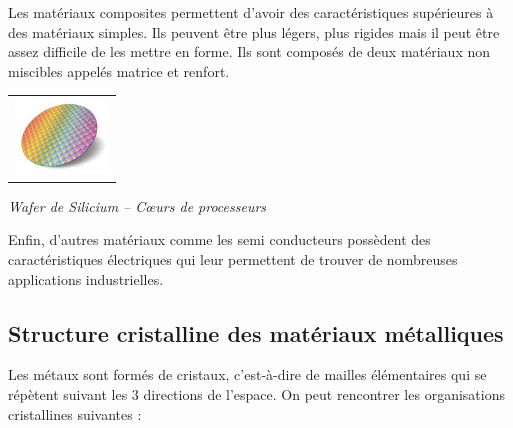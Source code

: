 \documentclass[11pt,oneside]{article}
\begin{document}
\vspace{.5cm}

Les matériaux composites permettent d'avoir des caractéristiques supérieures à des matériaux simples. Ils peuvent être plus légers, plus rigides mais il peut être assez difficile de les mettre en forme. Ils sont composés de deux matériaux non miscibles appelés matrice et renfort. 

\begin{minipage}[c]{.3\linewidth}
\begin{center}
\begin{tabular}{c}
\includegraphics[height=2cm]{png/wafer}
\\
\end{tabular}

\textit{Wafer de Silicium \cite{wafer} -- C\oe{}urs de processeurs}
\end{center}
\end{minipage}\hfill
\begin{minipage}[c]{.65\linewidth}
Enfin, d'autres matériaux comme les semi conducteurs possèdent des caractéristiques électriques qui leur permettent de trouver de nombreuses applications industrielles. 
\end{minipage}

\vspace{.5cm}


\subsection{Structure cristalline des matériaux métalliques}
Les métaux sont formés de cristaux, c'est-à-dire de mailles élémentaires qui se répètent suivant les 3 directions de l'espace. On peut rencontrer les organisations cristallines suivantes : 
\end{document}
